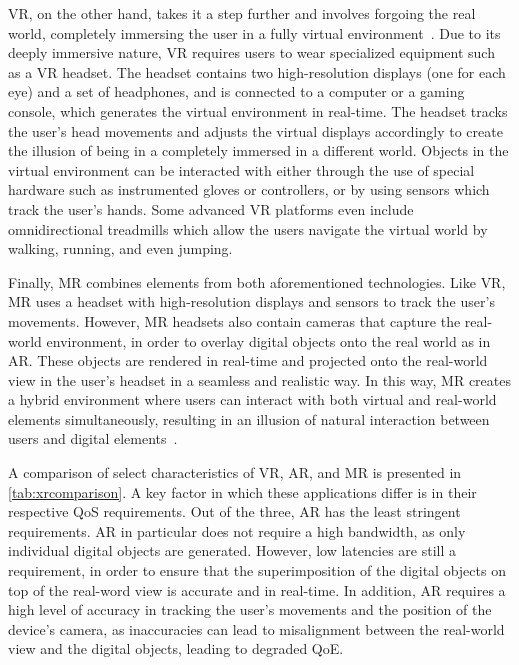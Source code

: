 \gls{VR}, on the other hand, takes it a step further and involves forgoing the real world, completely immersing the user in a fully virtual environment~\cite{doerner2022virtual}.
Due to its deeply immersive nature, \gls{VR} requires users to wear specialized equipment such as a \gls{VR} headset.
The headset contains two high-resolution displays (one for each eye) and a set of headphones, and is connected to a computer or a gaming console, which generates the virtual environment in real-time.
The headset tracks the user's head movements and adjusts the virtual displays accordingly to create the illusion of being in a completely immersed in a different world.
Objects in the virtual environment can be interacted with either through the use of special hardware such as instrumented gloves or controllers, or by using sensors which track the user's hands.
Some advanced \gls{VR} platforms even include omnidirectional treadmills which allow the users navigate the virtual world by walking, running, and even jumping. 

Finally, \gls{MR} combines elements from both aforementioned technologies.
Like \gls{VR}, \gls{MR} uses a headset with high-resolution displays and sensors to track the user's movements.
However, \gls{MR} headsets also contain cameras that capture the real-world environment, in order to overlay digital objects onto the real world as in \gls{AR}.
These objects are rendered in real-time and projected onto the real-world view in the user's headset in a seamless and realistic way.
In this way, \gls{MR} creates a hybrid environment where users can interact with both virtual and real-world elements simultaneously, resulting in an illusion of natural interaction between users and digital elements~\cite{speicher2019mixed}.



A comparison of select characteristics of \gls{VR}, \gls{AR}, and \gls{MR} is presented in \cref{tab:xrcomparison}.
A key factor in which these applications differ is in their respective \gls{QoS} requirements.
Out of the three, \gls{AR} has the least stringent requirements.
\gls{AR} in particular does not require a high bandwidth, as only individual digital objects are generated.
However, low latencies are still a requirement, in order to ensure that the superimposition of the digital objects on top of the real-word view is accurate and in real-time.
In addition, \gls{AR} requires a high level of accuracy in tracking the user's movements and the position of the device's camera, as inaccuracies can lead to misalignment between the real-world view and the digital objects, leading to degraded \gls{QoE}.

